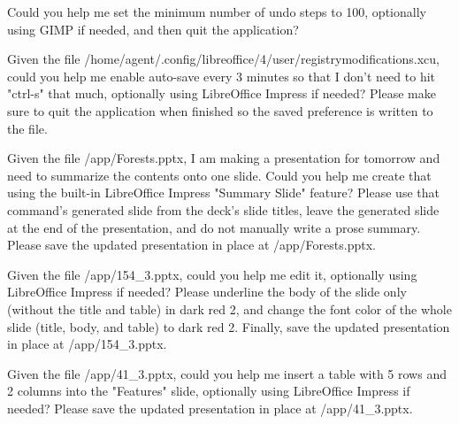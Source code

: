 \documentclass{llmxive}
\begin{document}
\begin{instructionbox}
Could you help me set the minimum number of undo steps to 100, optionally using GIMP if needed, and then quit the application?
\end{instructionbox}

\begin{instructionbox}
Given the file \textasciigrave{}/home/agent/.config/libreoffice/4/user/registrymodifications.xcu\textasciigrave{}, could you help me enable auto-save every 3 minutes so that I don't need to hit "ctrl-s" that much, optionally using LibreOffice Impress if needed? Please make sure to quit the application when finished so the saved preference is written to the file.
\end{instructionbox}

\begin{instructionbox}
Given the file \textasciigrave{}/app/Forests.pptx\textasciigrave{}, I am making a presentation for tomorrow and need to summarize the contents onto one slide. Could you help me create that using the built-in LibreOffice Impress "Summary Slide" feature? Please use that command's generated slide from the deck's slide titles, leave the generated slide at the end of the presentation, and do not manually write a prose summary. Please save the updated presentation in place at \textasciigrave{}/app/Forests.pptx\textasciigrave{}.
\end{instructionbox}

\begin{instructionbox}
Given the file \textasciigrave{}/app/154\_3.pptx\textasciigrave{}, could you help me edit it, optionally using LibreOffice Impress if needed? Please underline the body of the slide only (without the title and table) in dark red 2, and change the font color of the whole slide (title, body, and table) to dark red 2. Finally, save the updated presentation in place at \textasciigrave{}/app/154\_3.pptx\textasciigrave{}.
\end{instructionbox}

\begin{instructionbox}
Given the file \textasciigrave{}/app/41\_3.pptx\textasciigrave{}, could you help me insert a table with 5 rows and 2 columns into the "Features" slide, optionally using LibreOffice Impress if needed? Please save the updated presentation in place at \textasciigrave{}/app/41\_3.pptx\textasciigrave{}.
\end{instructionbox}
\end{document}
